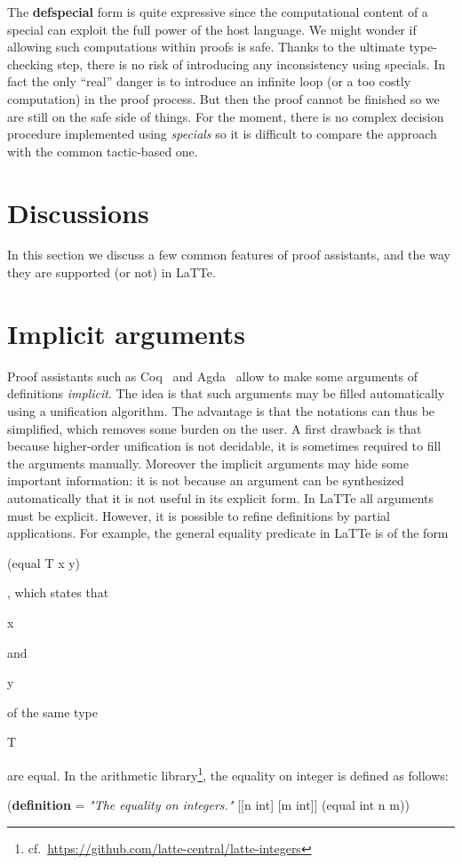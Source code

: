 \documentclass{styles/sig-alternate-05-2015}
\newcommand{\kw}[1]{\textbf{#1}}
\newcommand{\cmt}[1]{\textit{#1}}
\newcommand{\code}[1]{\begin{sffamily}{\small #1}\end{sffamily}}
\begin{document}
The \kw{defspecial} form is quite expressive since the computational content of a special
can exploit the full power of the host language. We might wonder if allowing such computations within
proofs is safe. Thanks to the ultimate type-checking step, there is no risk of introducing
any inconsistency using specials. In fact the only ``real'' danger is to introduce an
infinite loop (or a too costly computation) in the proof process. But then the proof cannot
be finished so we are still on the safe side of things. For the moment, there is no complex
decision procedure implemented using \emph{specials} so it is difficult to compare the
approach with the common tactic-based one.

\section{Discussions}
  \label{sec:discuss}

In this section we discuss a few common features of proof assistants, and
the way they are supported (or not) in LaTTe.

\section*{Implicit arguments} Proof assistants such as Coq~\cite{coq} and Agda~\cite{agda}
allow to make some arguments of definitions \emph{implicit}. The idea is that such arguments
may be filled automatically using a unification algorithm. The advantage is that the notations
can thus be simplified, which removes some burden on the user. A first drawback is that
because higher-order unification is not decidable, it is sometimes required to
fill the arguments manually. Moreover the implicit arguments may hide some important
information: it is not because an argument can be synthesized automatically that it
is not useful in its explicit form. In LaTTe all arguments must be explicit. However, it
is possible to refine definitions by partial applications. For example, the general equality
predicate in LaTTe is of the form \code{(equal T x y)}, which states that \code{x} and \code{y}
of the same type \code{T} are equal. In the arithmetic library\footnote{cf.~\url{https://github.com/latte-central/latte-integers}},
the equality on integer is defined as follows:

\begin{program}
(\kw{definition} =
  \cmt{"The equality on integers."}
  [[n int] [m int]]
  (equal int n m))
  \end{program}
\end{document}
